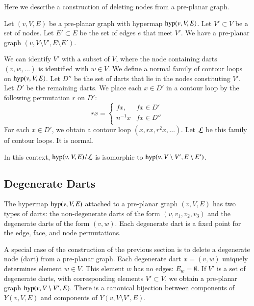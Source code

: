 
Here we describe a construction of deleting nodes from a 
pre-planar graph.  


Let $(v,V,E)$ be a pre-planar graph with hypermap ${\operatorname{hyp}}(v,V,E)$.
Let $V'\subset V$ be a set of nodes. 
Let $E'\subset E$ be the set of edges $e$ that meet $V'$.
We have a pre-planar graph $(v,V\setminus V',E\setminus E')$.

We can identify $V'$ with a subset of $V$, where
the node containing darts $(v,w,\ldots)$ is identified with $w\in V$.
We define a normal family of contour loops on 
${\operatorname{hyp}}(v,V,E)$.  Let $D''$ be the set of darts that lie in the
nodes constituting $V'$.  Let $D'$ be the remaining darts.
We place each $x\in D'$ in a contour
loop by the following permutation $r$ on $D'$:
    $$r x =
    \begin{cases}
    f x, & f x \in D'\\
    n^{-1} x & f x \in D''\\
    \end{cases}
    $$
For each $x\in D'$, we obtain a contour loop $(x,r x, r^2 x,\ldots)$.
Let $\cal L$ be this family of contour loops.  It is normal.

\begin{lemma} In this context,
${\operatorname{hyp}}(v,V,E)/{\cal L}$ is isomorphic to 
${\operatorname{hyp}}(v,V\setminus V',E\setminus E')$.
\end{lemma}



\subsection{Degenerate Darts}


The hypermap ${\operatorname{hyp}}(v,V,E)$ attached to a pre-planar graph $(v,V,E)$
has two types of darts: the non-degenerate darts of the form
$(v,v_1,v_2,v_3)$ and the degenerate darts of the form $(v,w)$.
Each degenerate dart is a  fixed point for the edge, face, and node
permutations.

A special case of the construction of the previous section
is to delete a degenerate node (dart) from a pre-planar graph.
Each degenerate dart $x=(v,w)$ uniquely determines element
$w\in V$.  This element $w$ has no edges: $E_w = \emptyset$.
If $V'$ is a set of degenerate darts, with corresponding elements
$V'\subset V$, 
we obtain a pre-planar graph
${\operatorname{hyp}}(v,V\setminus V',E)$.  There is a canonical bijection
between components of $Y(v,V,E)$ and components of $Y(v,V\setminus V',E)$.

